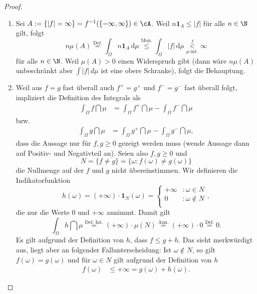 \marginpar{\textcolor{red}{Vorlesung 11}}

\begin{proof}\abs
	\begin{enumerate}[label=(\roman*)]
		\item Sei $A := \{ |f| = \infty \} = f^{-1}(\{ -\infty, \infty \}) \in \cA$. Weil  $ n \mathbf{1}_A \leq |f| $ f\"ur alle $n\in\N$ gilt, folgt \[ n \mu(A) \overset{\text{Def.}}{=} \int_{\Omega} n \mathbf{1}_A\, \mathrm{d}\mu \overset{\text{Mon.}}{\leq} \int_{\Omega} |f|\, \mathrm{d}\mu \overset{f}{\underset{\mu\text{-int.}}{<}} \infty \] f\"ur alle $n\in\N$.
		Weil $\mu(A) > 0$ einen Widerspruch gibt (dann w\"are $n \mu(A)$ unbeschr\"ankt aber $\int |f|\,d\mu$ ist eine obere Schranke), folgt die Behauptung.
		\item 
		Weil aus $ f=g $ fast überall auch $f^+ = g^+ $ und $ f^- = g^- $ fast \"uberall folgt, impliziert die Definition des Integrals als 
		\begin{align*}
			\int_{\Omega} f \dint \mu &= \int_{\Omega} f^+ \dint \mu - \int_{\Omega} f^- \dint \mu
		\end{align*}
		bzw.
		\begin{align*}
			\int_{\Omega} g \dint \mu &= \int_{\Omega} g^+ \dint \mu - \int_{\Omega} g^- \dint \mu,
		\end{align*}
		dass die Aussage nur für $f,g\geq0$ gezeigt werden muss (wende Aussage dann auf Positiv- und Negativteil an). Seien also $f,g \geq 0 $ und $$N = \{ f\neq g  \} = \{ \omega \colon f(\omega) \neq g(\omega) \}$$ die Nullmenge auf der $f$ und $g$ nicht \"ubereinstimmen. Wir definieren die Indikatorfunktion 
		\[ h(\omega) = (+\infty)\cdot \mathbf{1}_N (\omega) = \begin{cases}
		+\infty&: \omega \in N\\
		0&: \omega \notin N\\
		\end{cases}, \]
		die nur die Werte $0$ und $+\infty$ annimmt. Damit gilt
		\[ \int_{\Omega} h \dint \mu \overset{\text{Def. Int.}}{ =} (+\infty)\cdot \mu(N) \overset{\text{Ann.}}{=} (+\infty)\cdot 0 \overset{\text{Def.}}{=} 0. \]
		Es gilt aufgrund der Definition von $h$, dass $f \leq g + h$. Das sieht merkw\"urdigt aus, liegt aber an folgender Fallunterscheidung: Ist $\omega\notin N$, so gilt $f(\omega)=g(\omega)$ und f\"ur $\omega\in N$ gilt aufgrund der Definition von $h$
		\begin{align*}
			f(\omega) &\leq +\infty = g(\omega) + h(\omega).
		\end{align*}

\end{enumerate}
\end{proof}
